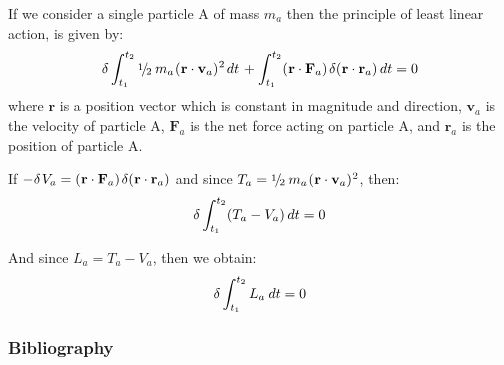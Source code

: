 \documentclass[10pt]{article}
\newcommand{\mM}{m}
\newcommand{\mL}{L}
\newcommand{\mT}{T}
\newcommand{\mV}{V}
\newcommand{\ra}{_a}
\newcommand{\vR}{\mathbf{r}}
\newcommand{\vV}{\mathbf{v}}
\newcommand{\vF}{\mathbf{F}}
\newcommand{\med}{\raise.5ex\hbox{$\scriptstyle 1$}\kern-.15em/\kern-.15em\lower.25ex\hbox{$\scriptstyle 2$}}
\begin{document}
\par If we consider a single particle A of mass $\mM\ra$ then the principle of least linear action, is given by:
\begin{eqnarray*}
\delta \int_{t_1}^{t_2} \med \hspace{+0.24em} \mM\ra \hspace{+0.06em} (\hspace{+0.03em} \vR \cdot \vV\ra)^{\hspace{+0.03em} 2} \hspace{+0.12em} dt \hspace{+0.12em} + \int_{t_1}^{t_2} (\hspace{+0.03em} \vR \cdot \vF\ra) \hspace{+0.12em} \delta (\hspace{+0.03em} \vR \cdot \vR\ra) \hspace{+0.18em} dt = 0
\end{eqnarray*}
\noindent where $\vR$ is a position vector which is constant in magnitude and direction, $\vV\ra$ is the velocity of particle A, $\vF\ra$ is the net force acting on particle A, and $\vR\ra$ is the position of particle A.
\medskip
\par If $- \hspace{+0.03em} \delta \hspace{+0.09em} \mV\ra = (\hspace{+0.03em} \vR \cdot \vF\ra) \hspace{+0.12em} \delta (\hspace{+0.03em} \vR \cdot \vR\ra)$ and since $\mT\ra = \med \hspace{+0.24em} \mM\ra \hspace{+0.06em} (\hspace{+0.03em} \vR \cdot \vV\ra)^{\hspace{+0.03em} 2}$, then:
\begin{eqnarray*}
\delta \int_{t_1}^{t_2} (\mT\ra - \mV\ra) \hspace{+0.18em} dt = 0
\end{eqnarray*}
\par And since $\mL\ra = \mT\ra - \mV\ra$, then we obtain:
\begin{eqnarray*}
\delta \int_{t_1}^{t_2} \mL\ra \hspace{+0.24em} dt = 0
\end{eqnarray*}

\vspace{+1.20em}

{\centering\subsubsection*{Bibliography}}
\end{document}
